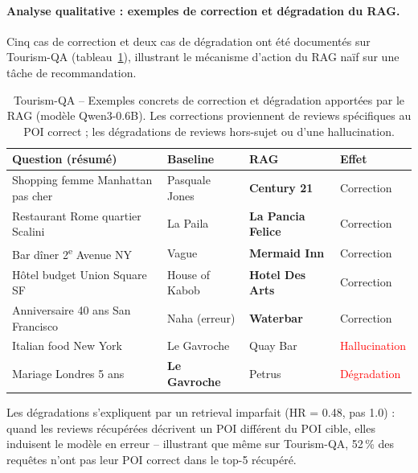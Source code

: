\documentclass[12pt,a4paper]{article}
\begin{document}
\paragraph{Analyse qualitative : exemples de correction et dégradation du RAG.}
Cinq cas de correction et deux cas de dégradation ont été documentés sur Tourism-QA
(tableau~\ref{tab:exemples_rag2}), illustrant le mécanisme d'action du RAG naïf sur
une tâche de recommandation.

\begin{table}[H]
\centering
\caption{Tourism-QA -- Exemples concrets de correction et d\'egradation apport\'ees
  par le RAG (mod\`ele Qwen3-0.6B). Les corrections proviennent de reviews sp\'ecifiques
  au POI correct ; les d\'egradations de reviews hors-sujet ou d'une hallucination.}
\label{tab:exemples_rag2}
\begin{tabular}{@{} p{4.8cm} p{2.5cm} p{2.5cm} p{2cm} @{}}
\toprule
\textbf{Question (r\'esum\'e)} & \textbf{Baseline} & \textbf{RAG} & \textbf{Effet} \\
\midrule
Shopping femme Manhattan pas cher & Pasquale Jones & \textbf{Century 21}
  & \textcolor{green!60!black}{Correction} \\
Restaurant Rome quartier Scalini  & La Paila & \textbf{La Pancia Felice}
  & \textcolor{green!60!black}{Correction} \\
Bar d\^iner 2\textsuperscript{e} Avenue NY & Vague & \textbf{Mermaid Inn}
  & \textcolor{green!60!black}{Correction} \\
H\^otel budget Union Square SF & House of Kabob & \textbf{Hotel Des Arts}
  & \textcolor{green!60!black}{Correction} \\
Anniversaire 40 ans San Francisco & Naha (erreur) & \textbf{Waterbar}
  & \textcolor{green!60!black}{Correction} \\
\midrule
Italian food New York & Le Gavroche & Quay Bar
  & \textcolor{red}{Hallucination} \\
Mariage Londres 5 ans & \textbf{Le Gavroche} & Petrus
  & \textcolor{red}{D\'egradation} \\
\bottomrule
\end{tabular}
\end{table}

\noindent Les dégradations s'expliquent par un retrieval imparfait (HR = 0.48, pas 1.0) :
quand les reviews récupérées décrivent un POI différent du POI cible, elles induisent
le modèle en erreur -- illustrant que même sur Tourism-QA, 52\,\% des requêtes
n'ont pas leur POI correct dans le top-5 récupéré.
\end{document}

